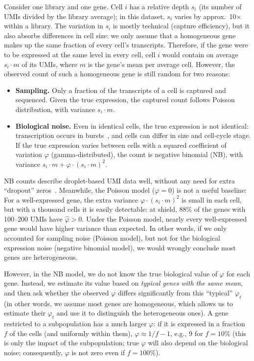 \documentclass[11pt,a4paper]{article}
\begin{document}
Consider one library and one gene. Cell $i$ has a relative depth $s_i$ (its number of UMIs divided by the library average); in this dataset, $s_i$ varies by approx.~10$\times$ within a library. The variation in $s_i$ is mostly technical (capture efficiency), but it also absorbs differences in cell size: we only assume that a homogeneous gene makes up the same fraction of every cell's transcripts. Therefore, if the gene were to be expressed at the same level in every cell, cell $i$ would contain on average $s_i \cdot m$ of its UMIs, where $m$ is the gene's mean per average cell. However, the observed count of such a homogeneous gene is still random for two reasons:
\begin{itemize}
	\item \textbf{Sampling.} Only a fraction of the transcripts of a cell is captured and sequenced. Given the true expression, the captured count follows Poisson distribution, with variance $s_i \cdot m$.
	\item \textbf{Biological noise.} Even in identical cells, the true expression is not identical: transcription occurs in bursts~\cite{raj2006bursting}, and cells can differ in size and cell-cycle stage. If the true expression varies between cells with a squared coefficient of variation $\varphi$ (gamma-distributed), the count is negative binomial (NB), with variance $s_i \cdot m + \varphi \cdot (s_i \cdot m)^2$.
\end{itemize}
NB counts describe droplet-based UMI data well, without any need for extra ``dropout'' zeros~\cite{grun2014noise,svensson2020zeros,hafemeister2019sctransform}. Meanwhile, the Poisson model ($\varphi = 0$) is not a useful baseline: For a well-expressed gene, the extra variance $\varphi \cdot (s_i \cdot m)^2$ is small in each cell, but with a thousand cells it is easily detectable: at shield, 88\% of the genes with 100--200 UMIs have $\hat\varphi > 0$. Under the Poisson model, nearly every well-expressed gene would have higher variance than expected. In other words, if we only accounted for sampling noise (Poisson model), but not for the biological expression noise (negative binomial model), we would wrongly conclude most genes are heterogeneous.

However, in the NB model, we do not know the true biological value of $\varphi$ for each gene. Instead, we estimate its value based on \emph{typical genes with the same mean}, and then ask whether the observed $\varphi$ differs significantly from this ``typical'' $\varphi_t$ (in other words, we assume most genes are homogeneous, which allows us to estimate their $\varphi_t$ and use it to distinguish the heterogeneous ones). A gene restricted to a subpopulation has a much larger $\varphi$: if it is expressed in a fraction $f$ of the cells (and uniformly within them), $\varphi \approx 1/f - 1$, e.g., 9 for $f = 10\%$ (this is only the impact of the subpopulation; true $\varphi$ will also depend on the biological noise; consequently, $\varphi$ is not zero even if $f=100\%$).
\end{document}
